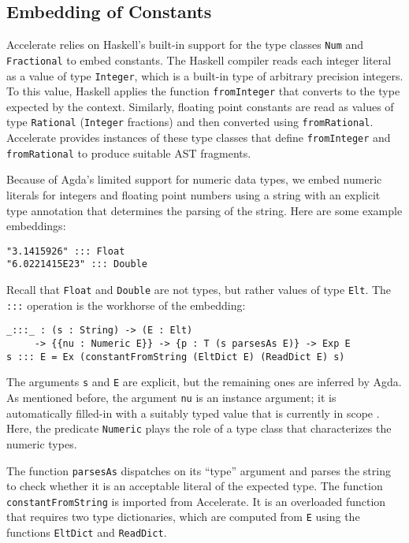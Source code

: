 \documentclass{llncs}
\begin{document}
\subsection{Embedding of Constants}
\label{sec:embedding-constants}

Accelerate relies on Haskell's built-in support for the type classes
\texttt{Num} and \texttt{Fractional} to embed constants. The Haskell
compiler reads each integer literal as a value of type
\texttt{Integer}, which is a built-in type of arbitrary precision
integers. To this value, Haskell applies the function
\texttt{fromInteger} that converts to the type expected by the
context. Similarly, floating point constants are read as values of
type \texttt{Rational} (\texttt{Integer} fractions) and then converted
using \texttt{fromRational}. Accelerate provides instances of these
type classes that define \texttt{fromInteger} and
\texttt{fromRational} to produce suitable AST fragments.

Because of Agda's limited support for numeric data types,
we embed numeric literals for integers and floating point numbers
using a string with an explicit type annotation that determines the
parsing of the string. Here are some example embeddings:
\begin{verbatim}
"3.1415926" ::: Float
"6.0221415E23" ::: Double
\end{verbatim}
Recall that \texttt{Float} and \texttt{Double} are not
types, but rather values of type \texttt{Elt}.
The \texttt{:::} operation is the workhorse of the embedding:
\begin{verbatim}
_:::_ : (s : String) -> (E : Elt) 
     -> {{nu : Numeric E}} -> {p : T (s parsesAs E)} -> Exp E
s ::: E = Ex (constantFromString (EltDict E) (ReadDict E) s)
\end{verbatim}
The arguments \texttt{s} and \texttt{E} are explicit, but the
remaining ones are inferred by Agda.
As mentioned before, the argument \texttt{nu} is an instance argument; it is automatically
filled-in with a suitably typed value that is currently in scope
\cite{DevriesePiessens2011}. Here, the predicate 
\texttt{Numeric} plays the role of a type class that characterizes
the numeric types.

The function \texttt{parsesAs} dispatches on its ``type'' argument and
parses the string to check whether it is an acceptable literal of the expected type. The
function \texttt{constantFromString} is imported from Accelerate.
It is an overloaded function that requires two type dictionaries,
which are computed from \texttt{E} using the functions \texttt{EltDict}
and \texttt{ReadDict}. 
\end{document}
